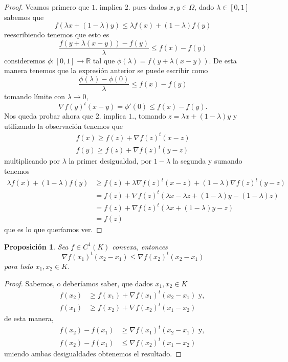 \documentclass[11pt]{article}
\theoremstyle{ejstyle}
\theoremstyle{ejstyle}
\theoremstyle{ejstyle}
\theoremstyle{ejstyle}
\theoremstyle{ejstyle}
\newtheorem{prop}{Proposición}
\theoremstyle{ejstyle}
\theoremstyle{ejstyle}
\begin{document}
 	\begin{proof}
 		Veamos primero que $1.$ implica $2.$ pues dados $x, y \in \Omega$, dado $\lambda \in [0, 1]$ sabemos que
 		$$
 		f(\lambda x + (1- \lambda) y) \leq \lambda f(x) + (1 - \lambda) f(y) 
 		$$ 
 		reescribiendo tenemos que esto es
 		$$ 
 		\frac{f(y + \lambda(x - y)) - f(y)}{\lambda} \leq f(x) - f(y) 
 		$$
 		consideremos $\phi : [0, 1] \to \mathbb{R}$ tal que $\phi(\lambda) = f(y + \lambda(x - y))$. De esta manera tenemos que la expresión anterior se puede escribir como
 		$$
 		\frac{\phi(\lambda) - \phi(0)}{\lambda} \leq f(x) - f(y) 
 		$$
 		tomando límite con $\lambda \to 0$,
 		$$
 		\nabla f(y)^{t} (x - y) = \phi'(0) \leq f(x) - f(y).
 		$$
 		Nos queda probar ahora que $2.$ implica $1.$, tomando $z = \lambda x + (1 - \lambda)y$ y utilizando la observación tenemos que
 		\[
 		\begin{aligned}
 		f(x) \geq f(z) + \nabla f(z)^{t} (x - z) \\
 		f(y) \geq f(z) + \nabla f(z)^{t} (y - z)	
 		\end{aligned}
 		\]
 		multiplicando por $\lambda$ la primer desigualdad, por $1-\lambda$ la segunda y sumando tenemos
 		\[
 		\begin{aligned}
 			\lambda f(x) + (1- \lambda)f(y) &\geq f(z) + \lambda \nabla f(z)^{t} (x - z) + (1-\lambda) \nabla f(z)^{t} (y - z) \\
 			&= f(z) + \nabla f(z)^{t} (\lambda x - \lambda z + (1 - \lambda) y - (1 - \lambda) z) \\
 			&= f(z) + \nabla f(z)^{t} (\lambda x + (1 - \lambda) y - z) \\
 			&= f(z)
 		\end{aligned}
 		\] 
 		que es lo que queríamos ver.
 	\end{proof}
 	
 	\begin{prop}
 		Sea $f \in C^{1}(K)$ convexa, entonces 
 		$$
 		\nabla f(x_1)^{t}(x_2 - x_1) \leq \nabla f(x_2)^{t} (x_2 - x_1)
 		$$
 		para todo $x_1, x_2 \in K$.
 	\end{prop}
 	
 	\begin{proof}
 		Sabemos, o deberíamos saber, que dados $x_1, x_2 \in K$
 		\[
 		\begin{aligned}
 			f(x_2) &\geq f(x_1) + \nabla f(x_1)^{t} (x_2 - x_1) \text{ y, } \\
 			f(x_1) &\geq f(x_2) + \nabla f(x_2)^{t} (x_1 - x_2)
 		\end{aligned}
 		\]
 		de esta manera, 
 		\[
 		\begin{aligned}
 			f(x_2) - f(x_1) &\geq \nabla f(x_1)^{t} (x_2 - x_1) \text{ y, } \\
 			f(x_2) - f(x_1) &\leq \nabla f(x_2)^{t} (x_1 - x_2)
 		\end{aligned}
 		\]
 		uniendo ambas desigualdades obtenemos el resultado.
 	\end{proof}
 	
\end{document}
